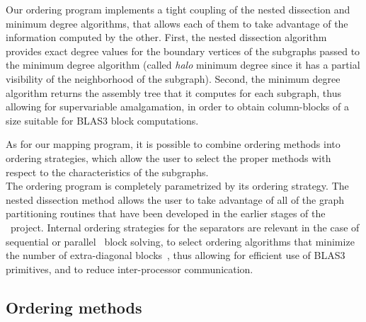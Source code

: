 Our ordering program implements a tight coupling of the nested dissection
and minimum degree algorithms, that allows each of them to take
advantage of the information computed by the other.
First, the nested dissection algorithm provides exact degree values
for the boundary vertices of the subgraphs passed to the minimum
degree algorithm (called \emph{halo\/} minimum degree since it has a
partial visibility of the neighborhood of the subgraph).
Second, the minimum degree algorithm returns the assembly tree that it
computes for each subgraph, thus allowing for supervariable amalgamation,
in order to obtain column-blocks of a size suitable for BLAS3 block
computations.

As for our mapping program, it is possible to combine ordering methods
into ordering strategies, which allow the user to select the proper
methods with respect to the characteristics of the subgraphs.
\\

The ordering program is completely parametrized by its ordering strategy.
The nested dissection method allows the user to take advantage of all of
the graph partitioning routines that have been developed in the earlier
stages of the \scotch\ project.
Internal ordering strategies for the separators are relevant in the case of
sequential or parallel~\cite{gukaku97,roth94,rogu93,rosc94} block solving,
to select ordering algorithms that minimize the number of extra-diagonal
blocks~\cite{chro89}, thus allowing for efficient use of BLAS3 primitives,
and to reduce inter-processor communication.

\subsection{Ordering methods}

